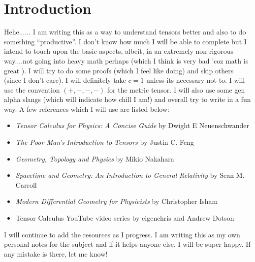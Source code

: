 \section{Introduction}
Hehe...... I am writing this as a way to understand tensors better and also to do something ``productive''. I don't know how much I will be able to complete but I intend to touch upon the basic aspects, albeit, in an extremely non-rigorous way....not going into heavy math perhaps (which I think is very bad 'coz math is great ). I will try to do some proofs (which I feel like doing) and skip others (since I don't care). I will definitely take $c=1$ unless its necessary not to. I will use the convention $(+,-,-,-)$ for the metric tensor. I will also use some gen alpha slangs (which will indicate how chill I am!) and overall try to write in a fun way. A few references which I will use are listed below:
\begin{itemize}
    \item \textit{Tensor Calculus for Physics: A Concise Guide
} by Dwight E Neuenschwander
\item \textit{The Poor Man’s Introduction to Tensors} by Justin C. Feng
\item \textit{Geometry, Topology and Physics} by Mikio Nakahara
\item \textit{Spacetime and Geometry: An Introduction to General Relativity} by Sean M. Carroll
\item \textit{Modern Differential Geometry for Physicists} by Christopher Isham
\item Tensor Calculus YouTube video series by eigenchris and Andrew Dotson
\end{itemize}
I will continue to add the resources as I progress. I am writing this as my own personal notes for the subject and if it helps anyone else, I will be super happy. If any mistake is there, let me know! 